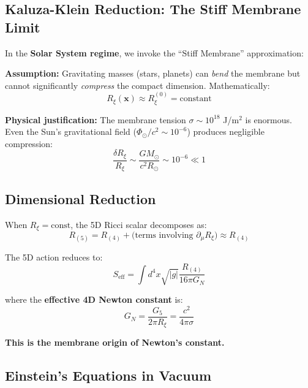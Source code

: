 \subsection{Kaluza-Klein Reduction: The Stiff Membrane Limit}

In the \textbf{Solar System regime}, we invoke the ``Stiff Membrane'' approximation:

\begin{tcolorbox}[colback=yellow!10,colframe=orange!70,title=Stiff Membrane Hypothesis]
\textbf{Assumption:} Gravitating masses (stars, planets) can \textit{bend} the membrane but cannot significantly \textit{compress} the compact dimension. Mathematically:
\begin{equation}
R_\xi(\mathbf{x}) \approx R_\xi^{(0)} = \text{constant}
\end{equation}
\end{tcolorbox}

\textbf{Physical justification:} The membrane tension $\sigma \sim 10^{18}$ J/m$^2$ is enormous. Even the Sun's gravitational field ($\Phi_\odot/c^2 \sim 10^{-6}$) produces negligible compression:
\begin{equation}
\frac{\delta R_\xi}{R_\xi} \sim \frac{GM_\odot}{c^2 R_\odot} \sim 10^{-6} \ll 1
\end{equation}

\subsection{Dimensional Reduction}

When $R_\xi = \text{const}$, the 5D Ricci scalar decomposes as:
\begin{equation}
R_{(5)} = R_{(4)} + \text{(terms involving } \partial_\mu R_\xi \text{)} \approx R_{(4)}
\end{equation}

The 5D action reduces to:
\begin{equation}
S_{\text{eff}} = \int d^4x \sqrt{|g|} \frac{R_{(4)}}{16\pi G_N}
\end{equation}

where the \textbf{effective 4D Newton constant} is:
\begin{equation}
\boxed{G_N = \frac{G_5}{2\pi R_\xi} = \frac{c^2}{4\pi\sigma}}
\end{equation}

\textbf{This is the membrane origin of Newton's constant.}

\subsection{Einstein's Equations in Vacuum}

